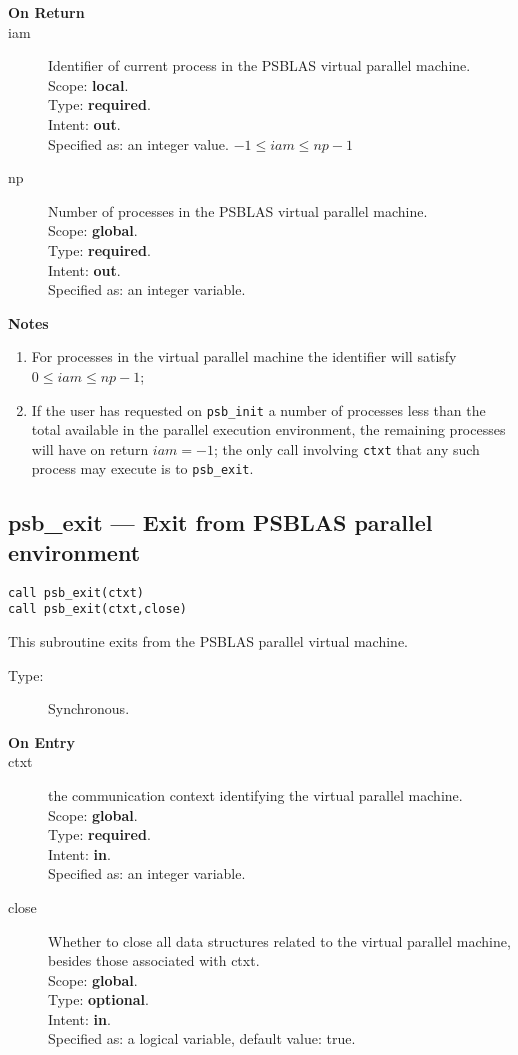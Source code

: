 \begin{description}
\item[\bf On Return]
\item[iam] Identifier of current  process in the PSBLAS virtual parallel machine.\\
Scope: {\bf local}.\\
Type: {\bf required}.\\
Intent: {\bf out}.\\
Specified as: an integer value. $-1 \le iam \le np-1$\
\item[np] Number of processes in the PSBLAS virtual parallel machine.\\
Scope: {\bf global}.\\
Type: {\bf required}.\\
Intent: {\bf out}.\\
Specified as: an integer variable. \
\end{description}


{\par\noindent\large\bfseries Notes}
\begin{enumerate}
\item For processes in the virtual parallel machine  the identifier
  will satisfy $0 \le iam \le np-1$;
\item If the user has requested on \verb|psb_init| a number of
  processes less than the total available in the parallel execution
  environment, the remaining processes will have on return $iam=-1$;
  the only call involving \verb|ctxt| that any such process may
  execute is  to \verb|psb_exit|. 
\end{enumerate}


\clearpage\subsection{psb\_exit --- Exit from  PSBLAS parallel
  environment}

\begin{verbatim}
call psb_exit(ctxt)
call psb_exit(ctxt,close)
\end{verbatim}

This subroutine exits from the  PSBLAS parallel virtual  machine.
\begin{description}
\item[Type:] Synchronous.
\item[\bf  On Entry ]
\item[ctxt] the communication context identifying the virtual
  parallel machine.\\
Scope: {\bf global}.\\
Type: {\bf required}.\\
Intent: {\bf in}.\\
Specified as: an integer variable.
\item[close] Whether to close all data structures related to the
  virtual parallel machine, besides those associated with ctxt.\\
Scope: {\bf global}.\\
Type: {\bf optional}.\\
Intent: {\bf in}.\\
Specified as: a logical  variable, default value: true.
\end{description}

